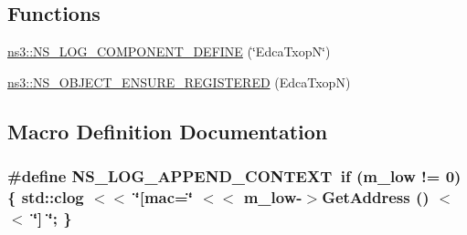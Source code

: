 \subsection*{Functions}
\begin{DoxyCompactItemize}
\item 
\hyperlink{namespacens3_a83001be3ba9f527221de2483877c325e}{ns3\+::\+N\+S\+\_\+\+L\+O\+G\+\_\+\+C\+O\+M\+P\+O\+N\+E\+N\+T\+\_\+\+D\+E\+F\+I\+NE} (\char`\"{}Edca\+TxopN\char`\"{})
\item 
\hyperlink{namespacens3_ae40aa42fa8d4aab1b726acd619e39a89}{ns3\+::\+N\+S\+\_\+\+O\+B\+J\+E\+C\+T\+\_\+\+E\+N\+S\+U\+R\+E\+\_\+\+R\+E\+G\+I\+S\+T\+E\+R\+ED} (Edca\+TxopN)
\end{DoxyCompactItemize}


\subsection{Macro Definition Documentation}
\subsubsection[{\texorpdfstring{N\+S\+\_\+\+L\+O\+G\+\_\+\+A\+P\+P\+E\+N\+D\+\_\+\+C\+O\+N\+T\+E\+XT}{NS_LOG_APPEND_CONTEXT}}]{\setlength{\rightskip}{0pt plus 5cm}\#define N\+S\+\_\+\+L\+O\+G\+\_\+\+A\+P\+P\+E\+N\+D\+\_\+\+C\+O\+N\+T\+E\+XT~{\bf if} (m\+\_\+low != 0) \{ std\+::clog $<$$<$ \char`\"{}\mbox{[}mac=\char`\"{} $<$$<$ m\+\_\+low-\/$>$Get\+Address () $<$$<$ \char`\"{}\mbox{]} \char`\"{}; \}}\hypertarget{edca-txop-n_8cc_abe50035652d407c40bdaef78214c4955}{}\label{edca-txop-n_8cc_abe50035652d407c40bdaef78214c4955}
